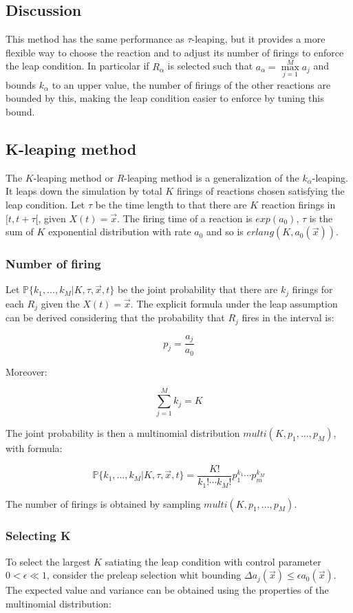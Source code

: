   \subsection{Discussion}
  This method has the same performance as $\tau$-leaping, but it provides a more flexible way to choose the reaction and to adjust its number of firings to enforce the leap condition.
  In particolar if $R_\alpha$ is selected such that $a_\alpha = \max\limits_{j=1}^Ma_j$ and bounds $k_\alpha$ to an upper value, the number of firings of the other reactions are bounded by this, making the leap condition easier to enforce by tuning this bound.

  \subsection{K-leaping method}
  The $K$-leaping method or $R$-leaping method is a generalization of the $k_\alpha$-leaping.
  It leaps down the simulation by total $K$ firings of reactions chosen satisfying the leap condition.
  Let $\tau$ be the time length to that there are $K$ reaction firings in $[t,t+\tau[$, given $X(t) = \vec{x}$.
  The firing time of a reaction is $exp(a_0)$, $\tau$ is the sum of $K$ exponential distribution with rate $a_0$ and so is $erlang(K, a_0(\vec{x}))$.

    \subsubsection{Number of firing}
    Let $\mathbb{P}\{k_1, \dots, k_M|K, \tau, \vec{x},t\}$ be the joint probability that there are $k_j$ firings for each $R_j$ given the $X(t) = \vec{x}$.
    The explicit formula under the leap assumption can be derived considering that the probability that $R_j$ fires in the interval is:

    $$p_j = \frac{a_j}{a_0}$$

    Moreover:

    $$\sum\limits_{j=1}^Mk_j = K$$

    The joint probability is then a multinomial distribution $multi(K, p_1, \dots, p_M)$, with formula:

    $$\mathbb{P}\{k_1, \dots, k_M|K, \tau, \vec{x},t\} = \frac{K!}{k_1!\cdots k_M!}p_1^{k_1}\cdots p_m^{k_M}$$

    The number of firings is obtained by sampling $multi(K, p_1, \dots, p_M)$.

    \subsubsection{Selecting K}
    To select the largest $K$ satiating the leap condition with control parameter $0<\epsilon\ll 1$, consider the preleap selection whit bounding $\Delta a_j(\vec{x})\le \epsilon a_0(\vec{x})$.
    The expected value and variance can be obtained using the properties of the multinomial distribution:

